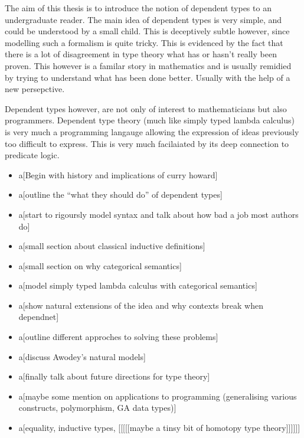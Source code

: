 The aim of this thesis is to introduce the notion of dependent types to an undergraduate reader. The main idea of dependent types is very simple, and could be understood by a small child. This is deceptively subtle however, since modelling such a formalism is quite tricky. This is evidenced by the fact that there is a lot of disagreement in type theory what has or hasn't really been proven. This however is a familar story in mathematics and is usually remidied by trying to understand what has been done better. Usually with the help of a new persepctive.

Dependent types however, are not only of interest to mathematicians but also programmers. Dependent type theory (much like simply typed lambda calculus) is very much a programming langauge allowing the expression of ideas previously too difficult to express. This is very much facilaiated by its deep connection to predicate logic. 


\begin{itemize}
\item a[Begin with history and implications of curry howard]

\item a[outline the ``what they should do'' of dependent types]

\item a[start to rigoursly model syntax and talk about how bad a job most authors do]

\item a[small section about classical inductive definitions]

\item a[small section on why categorical semantics]

\item a[model simply typed lambda calculus with categorical semantics]

\item a[show natural extensions of the idea and why contexts break when dependnet]

\item a[outline different approches to solving these problems]

\item a[discuss Awodey's natural models]

\item a[finally talk about future directions for type theory]

\item a[maybe some mention on applications to programming (generalising various constructs, polymorphism, GA data types)]

\item a[equality, inductive types, [[[[[maybe a tinsy bit of homotopy type theory]]]]]]
\end{itemize}


